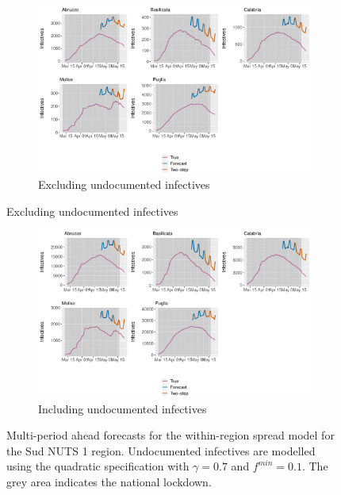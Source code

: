 \documentclass[12pt]{article}
\begin{document}
\begin{appendices}
        \begin{figure}[H]
    	    \centering
    	    \begin{subfigure}{\textwidth}
    	      \centering
    	      \includegraphics[width=0.91\linewidth]{output/model_within_lag14_forecast_full_Sud.pdf}
    	      \caption{Excluding undocumented infectives}
    	      \label{fig:forecast_full_within_sud_regular}
    	    \end{subfigure}
        \end{figure}
        \begin{figure}[H]\ContinuedFloat
    	    \begin{subfigure}{\textwidth}
    	      \centering
    	      \includegraphics[width=0.91\linewidth]{output/model_within_lag14_forecast_full_Sud_UndocQuadratic.pdf}
    	      \caption{Including undocumented infectives}
    	      \label{fig:forecast_full_within_sud_undoc}
    	    \end{subfigure}
    	    \caption{Multi-period ahead forecasts for the within-region spread model for the Sud NUTS 1 region. Undocumented infectives are modelled using the quadratic specification with $\gamma = 0.7$ and $f^{min}=0.1$. The grey area indicates the national lockdown.}
    	    \label{fig:forecast_full_within_sud}
        \end{figure}
        

\end{appendices}
\end{document}
